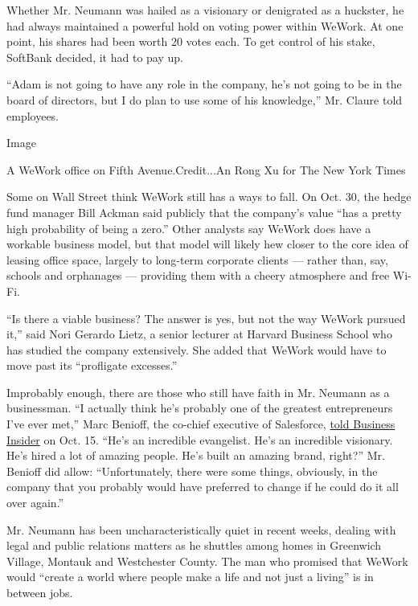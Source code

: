 Whether Mr. Neumann was hailed as a visionary or denigrated as a
huckster, he had always maintained a powerful hold on voting power
within WeWork. At one point, his shares had been worth 20 votes each. To
get control of his stake, SoftBank decided, it had to pay up.

``Adam is not going to have any role in the company, he's not going to
be in the board of directors, but I do plan to use some of his
knowledge,'' Mr. Claure told employees.

Image

A WeWork office on Fifth Avenue.Credit...An Rong Xu for The New York
Times

Some on Wall Street think WeWork still has a ways to fall. On Oct. 30,
the hedge fund manager Bill Ackman said publicly that the company's
value ``has a pretty high probability of being a zero.'' Other analysts
say WeWork does have a workable business model, but that model will
likely hew closer to the core idea of leasing office space, largely to
long-term corporate clients --- rather than, say, schools and orphanages
--- providing them with a cheery atmosphere and free Wi-Fi.

``Is there a viable business? The answer is yes, but not the way WeWork
pursued it,'' said Nori Gerardo Lietz, a senior lecturer at Harvard
Business School who has studied the company extensively. She added that
WeWork would have to move past its ``profligate excesses.''

Improbably enough, there are those who still have faith in Mr. Neumann
as a businessman. ``I actually think he's probably one of the greatest
entrepreneurs I've ever met,'' Marc Benioff, the co-chief executive of
Salesforce,
\href{https://www.businessinsider.com/marc-benioff-wework-adam-neumann-is-a-great-entrepreneur-2019-10}{told
Business Insider} on Oct. 15. ``He's an incredible evangelist. He's an
incredible visionary. He's hired a lot of amazing people. He's built an
amazing brand, right?'' Mr. Benioff did allow: ``Unfortunately, there
were some things, obviously, in the company that you probably would have
preferred to change if he could do it all over again.''

Mr. Neumann has been uncharacteristically quiet in recent weeks, dealing
with legal and public relations matters as he shuttles among homes in
Greenwich Village, Montauk and Westchester County. The man who promised
that WeWork would ``create a world where people make a life and not just
a living'' is in between jobs.

